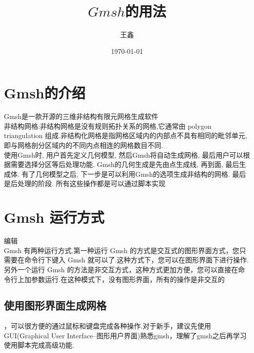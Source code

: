 \documentclass[12pt]{article}
\begin{document}
\begin{CJK}{UTF8}{gkai}
    \title{$Gmsh$的用法}
    \date{\today}
    \author{王鑫}
    \maketitle
    \section{Gmsh的介绍} 
    \qquad Gmsh是一款开源的三维非结构有限元网格生成软件\\ 
    
    非结构网格:非结构网格是没有规则拓扑关系的网格,它通常由 polygon triangulation 组成.非结构化网格是指网格区域内的内部点不具有相同的毗邻单元,即与网格剖分区域内的不同内点相连的网格数目不同.\\ 
    
    使用Gmsh时, 用户首先定义几何模型, 然后Gmsh将自动生成网格, 最后用户可以根据需要选择分区等后处理功能. Gmsh的几何生成是先由点生成线, 再到面, 最后生成体. 有了几何模型之后, 下一步是可以利用Gmsh的选项生成非结构的网格. 最后是后处理的阶段. 所有这些操作都是可以通过脚本实现\\
    \section{Gmsh 运行方式}
    
    编辑\\
    Gmsh 有两种运行方式.第一种运行 Gmsh 的方式是交互式的图形界面方式，您只需要在命令行下键入 Gmsh 就可以了.这种方式下，您可以在图形界面下进行操作.另外一个运行 Gmsh 的方法是非交互方式，这种方式更加方便，您可以直接在命令行上加参数运行.在这种模式下，没有图形界面，所有的操作是非交互的\\
	\subsection{使用图形界面生成网格}
	
	，可以很方便的通过鼠标和键盘完成各种操作.对于新手，建议先使用GUI(Graphical User Interface--图形用户界面)熟悉gmsh，理解了gmsh之后再学习使用脚本完成高级功能.\\
	

\end{CJK}
\end{document}
